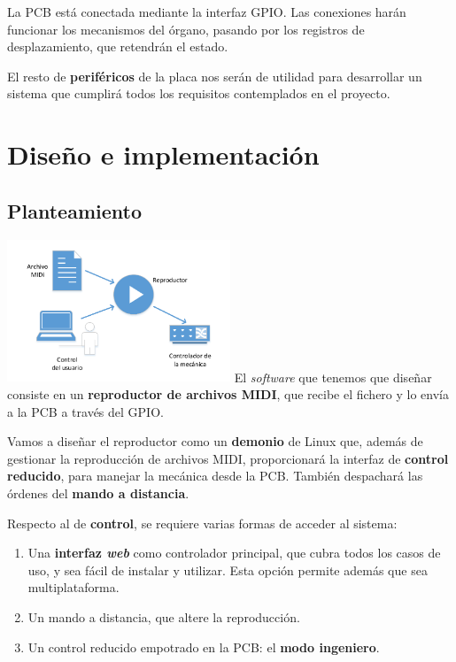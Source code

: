 \documentclass[10pt,a4paper]{article}
\begin{document}
	La PCB está conectada mediante la interfaz GPIO. Las conexiones harán funcionar los mecanismos del órgano, pasando por los registros de desplazamiento, que retendrán el estado.
	
	El resto de \textbf{periféricos} de la placa nos serán de utilidad para desarrollar un sistema que cumplirá todos los requisitos contemplados en el proyecto.
	
	
	\section{Diseño e implementación}
	
	\subsection{Planteamiento}
	
	\begin{multicols}{2}
		\noindent
		\includegraphics[width=0.5\textwidth]{images/idea} 
		\columnbreak
		El \textit{software} que tenemos que diseñar consiste en un \textbf{reproductor de archivos MIDI}, que recibe el fichero y lo envía a la PCB a través del GPIO.
		
		Vamos a diseñar el reproductor como un \textbf{demonio} de Linux que, además de gestionar la reproducción de archivos MIDI, proporcionará la interfaz de \textbf{control reducido}, para manejar la mecánica desde la PCB. También despachará las órdenes del \textbf{mando a distancia}.
	\end{multicols}
	
	Respecto al de \textbf{control}, se requiere varias formas de acceder al sistema:
	
	\begin{enumerate}
		\item Una \textbf{interfaz \textit{web}} como controlador principal, que cubra todos los casos de uso, y sea fácil de instalar y utilizar. Esta opción permite además que sea multiplataforma.
		
		\item Un mando a distancia, que altere la reproducción.
		
		\item Un control reducido empotrado en la PCB: el \textbf{modo ingeniero}.
	\end{enumerate}
	
\end{document}
